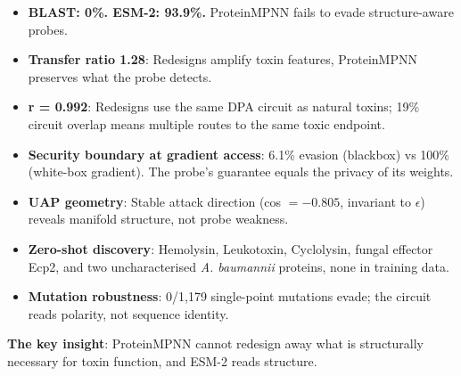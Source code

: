 \documentclass[11pt,a4paper]{article}
\begin{document}
\begin{itemize}
    \item \textbf{BLAST: 0\%. ESM-2: 93.9\%.} ProteinMPNN fails to evade structure-aware probes.
    \item \textbf{Transfer ratio 1.28}: Redesigns amplify toxin features, ProteinMPNN preserves what the probe detects.
    \item \textbf{r = 0.992}: Redesigns use the same DPA circuit as natural toxins; 19\% circuit overlap means multiple routes to the same toxic endpoint.
    \item \textbf{Security boundary at gradient access}: 6.1\% evasion (blackbox) vs 100\% (white-box gradient). The probe's guarantee equals the privacy of its weights.
    \item \textbf{UAP geometry}: Stable attack direction (cos $= -0.805$, invariant to $\epsilon$) reveals manifold structure, not probe weakness.
    \item \textbf{Zero-shot discovery}: Hemolysin, Leukotoxin, Cyclolysin, fungal effector Ecp2, and two uncharacterised \textit{A. baumannii} proteins, none in training data.
    \item \textbf{Mutation robustness}: 0/1,179 single-point mutations evade; the circuit reads polarity, not sequence identity.
\end{itemize}

\textbf{The key insight}: ProteinMPNN cannot redesign away what is structurally necessary for toxin function, and ESM-2 reads structure.


\appendix

\end{document}
